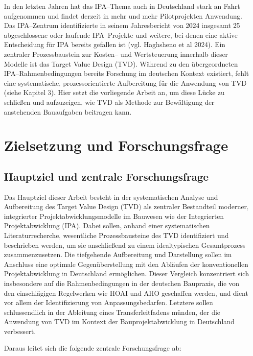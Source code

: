 In den letzten Jahren hat das IPA--Thema auch in Deutschland stark an Fahrt aufgenommen und findet derzeit in mehr und mehr Pilotprojekten Anwendung. Das IPA--Zentrum identifizierte in seinem Jahresbericht von 2024 insgesamt 25 abgeschlossene oder laufende IPA--Projekte und weitere, bei denen eine aktive Entscheidung für IPA bereits gefallen ist (vgl. Haghsheno et al 2024). Ein zentraler Prozessbaustein zur Kosten-- und Wertsteuerung innerhalb dieser Modelle ist das Target Value Design (TVD)\autocite[]{Testkey}. Während zu den übergeordneten IPA--Rahmenbedingungen bereits Forschung im deutschen Kontext existiert\autocite[]{haghsheno2024}, fehlt eine systematische, prozessorientierte  Aufbereitung für die Anwendung von TVD (siehe Kapitel 3). Hier setzt die vorliegende  Arbeit an, um diese Lücke zu schließen und aufzuzeigen, wie TVD als Methode zur Bewältigung der anstehenden Bauaufgaben beitragen kann.

\section*{Zielsetzung und Forschungsfrage}
\label{sec:zielsetzung}

\subsection*{Hauptziel und zentrale Forschungsfrage}
Das Hauptziel dieser Arbeit besteht in der systematischen Analyse und Aufbereitung des Target Value Design (TVD) als zentraler Bestandteil moderner, integrierter Projektabwicklungsmodelle im Bauwesen wie der Integrierten Projektabwicklung (IPA). Dabei sollen, anhand einer systematischen Literaturrecherche, wesentliche Prozessbausteine des TVD identifiziert und beschrieben werden, um sie anschließend zu einem idealtypischen Gesamtprozess zusammenzusetzen. Die tiefgehende Aufbereitung und Darstellung sollen im Anschluss eine optimale Gegenüberstellung mit den Abläufen der konventionellen Projektabwicklung in Deutschland ermöglichen. Dieser Vergleich konzentriert sich insbesondere auf die Rahmenbedingungen in der deutschen Baupraxis, die von den einschlägigen Regelwerken wie HOAI und AHO geschaffen werden, und dient vor allem der Identifizierung von Anpassungsbedarfen. Letztere sollen schlussendlich in der Ableitung eines Transferleitfadens münden, der die Anwendung von TVD im Kontext der Bauprojektabwicklung in Deutschland verbessert.

Daraus leitet sich die folgende zentrale Forschungsfrage ab:

